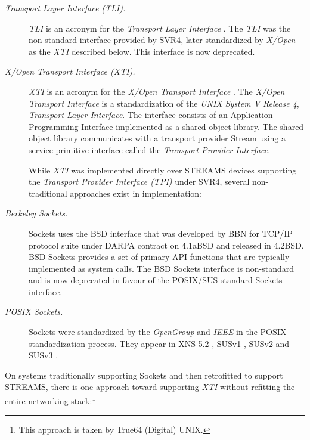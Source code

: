 \documentclass[letterpaper,final,notitlepage,twocolumn,10pt,twoside]{article}
\begin{document}
\begin{description}

\item[{\it Transport Layer Interface (TLI).}]

\textsl{TLI} is an acronym for the \textit{Transport Layer Interface}
\cite[]{tli}.  The \textsl{TLI} was the non-standard interface provided by
SVR4, later standardized by \textit{X/Open} as the \textsl{XTI} described
below.  This interface is now deprecated.

\item[{\it X/Open Transport Interface (XTI).}]

\textsl{XTI} is an acronym for the \textsl{X/Open Transport Interface}
\cite[]{xti}.  The \textsl{X/Open Transport Interface} is a standardization of
the \textsl{UNIX System V Release 4}, \textsl{Transport Layer Interface}.  The
interface consists of an Application Programming Interface implemented as a
shared object library.  The shared object library communicates with a
transport provider Stream using a service primitive interface called the
\textsl{Transport Provider Interface}.

While \textsl{XTI} was implemented directly over STREAMS devices supporting
the \textit{Transport Provider Interface (TPI)} \cite[]{tpi} under SVR4,
several non-traditional approaches exist in implementation:

\item[{\it Berkeley Sockets.}]

Sockets uses the BSD interface that was developed by BBN for TCP/IP protocol
suite under DARPA contract on 4.1aBSD and released in 4.2BSD.  BSD Sockets
provides a set of primary API functions that are typically implemented as
system calls.  The BSD Sockets interface is non-standard and is now
deprecated in favour of the POSIX/SUS standard Sockets interface.

\item[{\it POSIX Sockets.}]

Sockets were standardized by the \textit{OpenGroup} \cite[]{opengroup} and
\textit{IEEE} in the POSIX standardization process.  They appear in XNS 5.2
\cite[]{xns}, SUSv1 \cite[]{susv1}, SUSv2 \cite[]{susv2} and SUSv3
\cite[]{susv3}.

\end{description}

On systems traditionally supporting Sockets and then retrofitted to support
STREAMS, there is one approach toward supporting \textsl{XTI} without
refitting the entire networking stack:\footnote{This approach is taken by
True64 (Digital) UNIX.}
\end{document}

